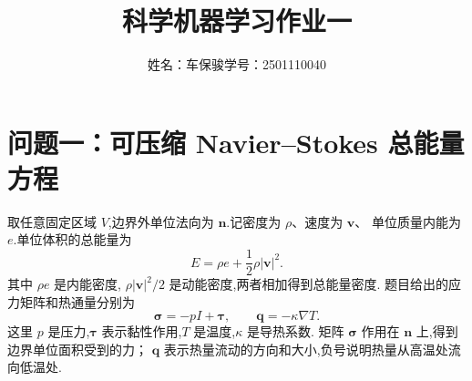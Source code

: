 \documentclass[UTF8,a4paper,11pt,fontset=fandol]{ctexart}
\title{科学机器学习作业一\\[0.3em]}
\author{姓名：车保骏\qquad 学号：2501110040}
\numberwithin{equation}{section}
\newcommand{\vv}{\bm{v}}
\newcommand{\nn}{\bm{n}}
\newcommand{\qq}{\bm{q}}
\newcommand{\cc}{\bm{c}}
\begin{document}
\maketitle


\section{问题一：可压缩 Navier--Stokes 总能量方程}

取任意固定区域 $V$,边界外单位法向为 $\nn$.记密度为 $\rho$、速度为 $\vv$、
单位质量内能为 $e$.单位体积的总能量为
\begin{equation}
  E=\rho e+\frac12\rho|\vv|^2.
\end{equation}
其中 $\rho e$ 是内能密度, $\rho|\vv|^2/2$ 是动能密度,两者相加得到总能量密度.
题目给出的应力矩阵和热通量分别为
\begin{equation}
 \bm{\sigma}=-pI+\bm{\tau},\qquad \qq=-\kappa\nabla T.
\end{equation}
这里 $p$ 是压力,$\bm{\tau}$ 表示黏性作用,$T$ 是温度,$\kappa$ 是导热系数.
矩阵 $\bm{\sigma}$ 作用在 $\nn$ 上,得到边界单位面积受到的力；
$\qq$ 表示热量流动的方向和大小,负号说明热量从高温处流向低温处.
\end{document}
